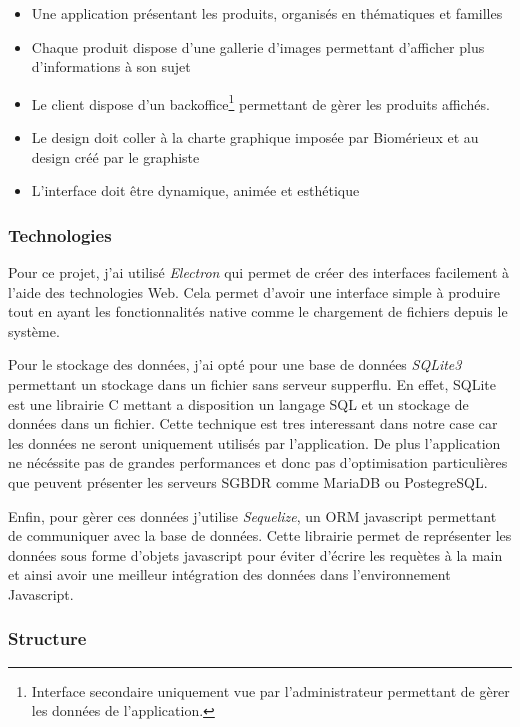 \documentclass{article}
\begin{document}
\medskip

\begin{itemize}
    \item Une application présentant les produits, organisés en thématiques et familles
    \item Chaque produit dispose d'une gallerie d'images permettant d'afficher plus d'informations à son sujet
    \item Le client dispose d'un backoffice\footnote{Interface secondaire uniquement vue par l'administrateur permettant de gèrer les données de l'application.} permettant de gèrer les produits affichés.
    \item Le design doit coller à la charte graphique imposée par Biomérieux et au design créé par le graphiste
    \item L'interface doit être dynamique, animée et esthétique
\end{itemize}

\subsubsection{Technologies}

Pour ce projet, j'ai utilisé \emph{Electron} qui permet de créer des interfaces facilement à l'aide des technologies Web.
Cela permet d'avoir une interface simple à produire tout en ayant les fonctionnalités native comme le chargement de fichiers depuis le système.

Pour le stockage des données, j'ai opté pour une base de données \emph{SQLite3} permettant un stockage dans un fichier sans serveur supperflu.
En effet, SQLite est une librairie C mettant a disposition un langage SQL et un stockage de données dans un fichier.
Cette technique est tres interessant dans notre case car les données ne seront uniquement utilisés par l'application.
De plus l'application ne nécéssite pas de grandes performances et donc pas d'optimisation particulières que peuvent présenter les serveurs SGBDR comme MariaDB ou PostegreSQL.

Enfin, pour gèrer ces données j'utilise \emph{Sequelize}, un ORM javascript permettant de communiquer avec la base de données.
Cette librairie permet de représenter les données sous forme d'objets javascript pour éviter d'écrire les requètes à la main et ainsi avoir une meilleur intégration des données dans l'environnement Javascript.

\subsubsection{Structure}
\end{document}
